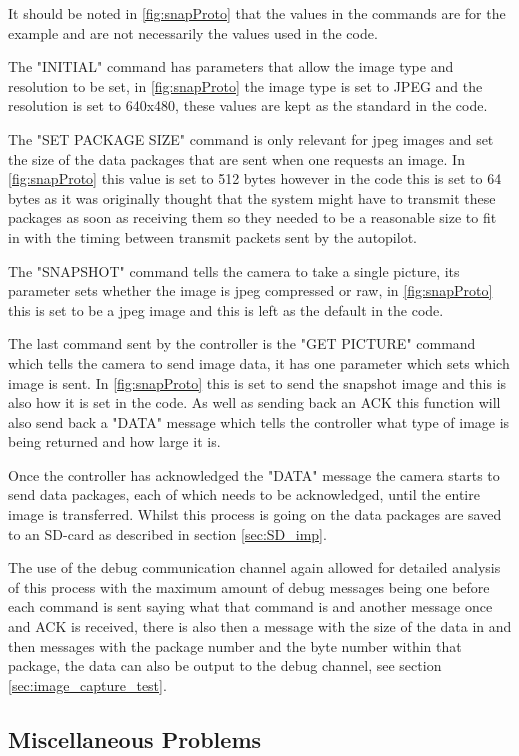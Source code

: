 It should be noted in \ref{fig:snapProto} that the values in the commands are for the example and are not necessarily the values used in the code.

The "INITIAL" command has parameters that allow the image type and resolution to be set, in \ref{fig:snapProto} the image type is set to JPEG and the resolution is set to 640x480, these values are kept as the standard in the code.

The "SET PACKAGE SIZE" command is only relevant for jpeg images and set the size of the data packages that are sent when one requests an image. In \ref{fig:snapProto} this value is set to 512 bytes however in the code this is set to 64 bytes as it was originally thought that the system might have to transmit these packages as soon as receiving them so they needed to be a reasonable size to fit in with the timing between transmit packets sent by the autopilot.

The "SNAPSHOT" command tells the camera to take a single picture, its parameter sets whether the image is jpeg compressed or raw, in \ref{fig:snapProto} this is set to be a jpeg image and this is left as the default in the code.

The last command sent by the controller is the "GET PICTURE" command which tells the camera to send image data, it has one parameter which sets which image is sent. In \ref{fig:snapProto} this is set to send the snapshot image and this is also how it is set in the code. As well as sending back an ACK this function will also send back a "DATA" message which tells the controller what type of image is being returned and how large it is.

Once the controller has acknowledged the "DATA" message the camera starts to send data packages, each of which needs to be acknowledged, until the entire image is transferred. Whilst this process is going on the data packages are saved to an SD-card as described in section \ref{sec:SD_imp}.

The use of the debug communication channel again allowed for detailed analysis of this process with the maximum amount of debug messages being one before each command is sent saying what that command is and another message once and ACK is received, there is also then a message with the size of the data in and then messages with the package number and the byte number within that package, the data can also be output to the debug channel, see section \ref{sec:image_capture_test}.

\subsection{Miscellaneous Problems}
\label{sec:misc_cam_probs}

